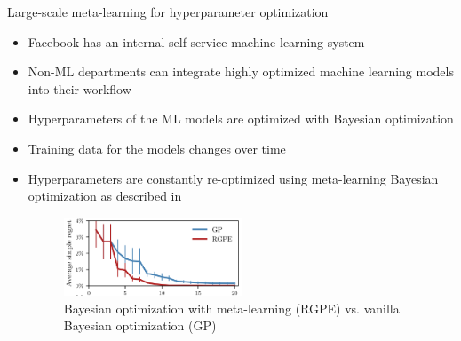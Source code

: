 

\begin{frame}[c]{Large-scale meta-learning for hyperparameter optimization}

\begin{itemize}
    \item Facebook has an internal self-service machine learning system
    \item Non-ML departments can integrate highly optimized machine learning models into their workflow
    \item Hyperparameters of the ML models are optimized with Bayesian optimization
    \item Training data for the models changes over time \item Hyperparameters are constantly re-optimized using meta-learning Bayesian optimization as described in 
    \begin{figure}
        \centering
        \includegraphics[width=0.5\textwidth]{../w07_hpo_speedup/images/success_stories/FB_RGPE.png}
        \caption{Bayesian optimization with meta-learning (RGPE) vs. vanilla Bayesian optimization (GP)}
    \end{figure}
\end{itemize}

\end{frame}


